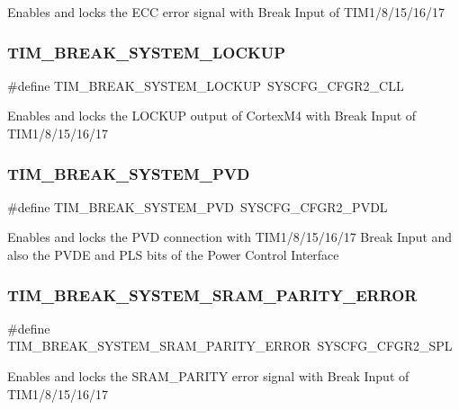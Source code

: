 Enables and locks the E\+CC error signal with Break Input of T\+I\+M1/8/15/16/17 \mbox{\label{group___t_i_m___break___system_ga9b84149e41633c45c50c5cdcbbd63dc0}} 
\subsubsection{\texorpdfstring{TIM\_BREAK\_SYSTEM\_LOCKUP}{TIM\_BREAK\_SYSTEM\_LOCKUP}}
{\footnotesize\ttfamily \#define T\+I\+M\+\_\+\+B\+R\+E\+A\+K\+\_\+\+S\+Y\+S\+T\+E\+M\+\_\+\+L\+O\+C\+K\+UP~S\+Y\+S\+C\+F\+G\+\_\+\+C\+F\+G\+R2\+\_\+\+C\+LL}

Enables and locks the L\+O\+C\+K\+UP output of Cortex\+M4 with Break Input of T\+I\+M1/8/15/16/17 \mbox{\label{group___t_i_m___break___system_ga389af93f9a1789e7de509991ef23cfec}} 
\subsubsection{\texorpdfstring{TIM\_BREAK\_SYSTEM\_PVD}{TIM\_BREAK\_SYSTEM\_PVD}}
{\footnotesize\ttfamily \#define T\+I\+M\+\_\+\+B\+R\+E\+A\+K\+\_\+\+S\+Y\+S\+T\+E\+M\+\_\+\+P\+VD~S\+Y\+S\+C\+F\+G\+\_\+\+C\+F\+G\+R2\+\_\+\+P\+V\+DL}

Enables and locks the P\+VD connection with T\+I\+M1/8/15/16/17 Break Input and also the P\+V\+DE and P\+LS bits of the Power Control Interface \mbox{\label{group___t_i_m___break___system_gaf359a8c2dde8fda9cb026926b8402dee}} 
\subsubsection{\texorpdfstring{TIM\_BREAK\_SYSTEM\_SRAM\_PARITY\_ERROR}{TIM\_BREAK\_SYSTEM\_SRAM\_PARITY\_ERROR}}
{\footnotesize\ttfamily \#define T\+I\+M\+\_\+\+B\+R\+E\+A\+K\+\_\+\+S\+Y\+S\+T\+E\+M\+\_\+\+S\+R\+A\+M\+\_\+\+P\+A\+R\+I\+T\+Y\+\_\+\+E\+R\+R\+OR~S\+Y\+S\+C\+F\+G\+\_\+\+C\+F\+G\+R2\+\_\+\+S\+PL}

Enables and locks the S\+R\+A\+M\+\_\+\+P\+A\+R\+I\+TY error signal with Break Input of T\+I\+M1/8/15/16/17 